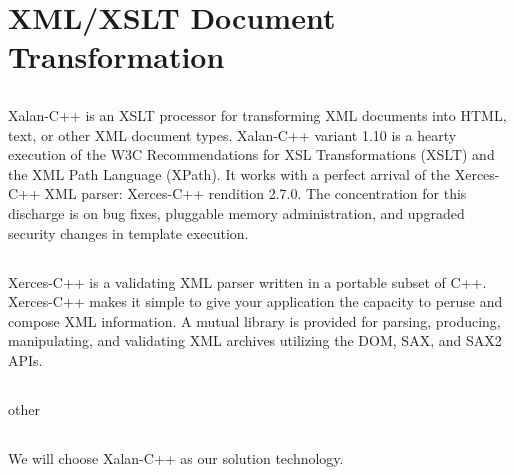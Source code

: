 \section{XML/XSLT Document Transformation}

\subsection{}
Xalan-C++ is an XSLT processor for transforming XML documents into HTML, text, or other XML document types. Xalan-C++ variant 1.10 is a hearty execution of the W3C Recommendations for XSL Transformations (XSLT) and the XML Path Language (XPath). It works with a perfect arrival of the Xerces-C++ XML parser: Xerces-C++ rendition 2.7.0. The concentration for this discharge is on bug fixes, pluggable memory administration, and upgraded security changes in template execution.   
\subsection{}
Xerces-C++ is a validating XML parser written in a portable subset of C++. Xerces-C++ makes it simple to give your application the capacity to peruse and compose XML information. A mutual library is provided for  parsing, producing, manipulating, and validating XML archives utilizing the DOM, SAX, and SAX2 APIs.

\subsection{}
other


\subsection{}
We will choose Xalan-C++ as our solution technology.


